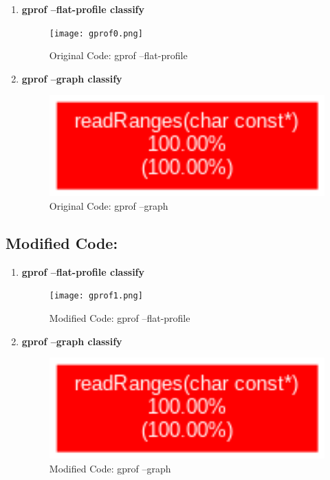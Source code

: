 \documentclass{article}
\begin{document}
\begin{enumerate}
    \item \textbf{gprof --flat-profile classify}\\
    \begin{figure}[H]
        \centering
        \texttt{[image: gprof0.png]}
        \caption{Original Code: gprof --flat-profile}
    \end{figure}

    \item \textbf{gprof --graph classify}\\
    \begin{figure}[H]
        \centering
        \includegraphics[width=12cm]{gprofc0.png}
        \caption{Original Code: gprof --graph}
    \end{figure}
\end{enumerate}




\subsection{Modified Code: }
\begin{enumerate}
    \item \textbf{gprof --flat-profile classify}\\
    \begin{figure}[H]
        \centering
        \texttt{[image: gprof1.png]}
        \caption{Modified Code: gprof --flat-profile}
    \end{figure}

    \item \textbf{gprof --graph classify}\\
    \begin{figure}[H]
        \centering
        \includegraphics[width=12cm]{gprofc1.png}
        \caption{Modified Code: gprof --graph}
    \end{figure}
\end{enumerate}
\end{document}
